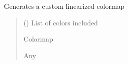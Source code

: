 \documentclass[letterpaper,10pt,english]{sphinxmanual}
\begin{document}
\begin{fulllineitems}
\label{\detokenize{Coloring:Coloring.generate_custom_map}}
\pysigstartsignatures
{}
\pysigstopsignatures
\sphinxAtStartPar
Generates a custom linearized colormap
\begin{quote}\begin{description}
\sphinxAtStartPar
{} (\sphinxstyleliteralemphasis{\sphinxupquote{{[}}}\sphinxstyleliteralemphasis{\sphinxupquote{{]}}}) \textendash{} List of colors included

\sphinxAtStartPar
Colormap

\sphinxAtStartPar
Any

\end{description}\end{quote}

\end{fulllineitems}

\end{document}

